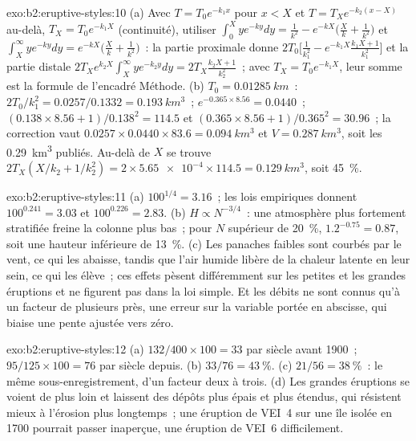 \begin{solution}{exo:b2:eruptive-styles:10}
(a) Avec $T = T_0e^{-k_1x}$ pour $x < X$ et $T = T_Xe^{-k_2(x - X)}$ au-delà, $T_X =
T_0e^{-k_1X}$ (continuité), utiliser $\int_0^X ye^{-ky}dy = \frac{1}{k^2} - e^{-kX}\big(\frac{X}{k} +
\frac{1}{k^2}\big)$ et $\int_X^\infty ye^{-ky}dy = e^{-kX}\big(\frac{X}{k} +
\frac{1}{k^2}\big)$~:
la partie proximale donne $2T_0\big[\frac{1}{k_1^2} - e^{-k_1X}\frac{k_1X + 1}{k_1^2}\big]$ et la
partie distale $2T_Xe^{k_2X}\int_X^\infty ye^{-k_2y}dy = 2T_X\frac{k_2X + 1}{k_2^2}$~; avec $T_X =
T_0e^{-k_1X}$, leur somme est la formule de l'encadré Méthode.
(b) $T_0 = \qty{0.01285}{km}$~: $2T_0/k_1^2 = 0.0257/0.1332 = \qty{0.193}{km^3}$~;
$e^{-0.365\times8.56} = 0.0440$~; $(0.138\times8.56 + 1)/0.138^2 = 114.5$ et
$(0.365\times8.56 + 1)/0.365^2 = 30.96$~; la correction vaut $0.0257\times0.0440\times83.6
= \qty{0.094}{km^3}$ et $V = \qty{0.287}{km^3}$, soit les \qty{0.29}{km^3} publiés.
Au-delà de $X$ se trouve $2T_X(X/k_2 + 1/k_2^2) = 2\times\num{5.65e-4}\times114.5 =
\qty{0.129}{km^3}$, soit \qty{45}{\percent}.
\end{solution}

\begin{solution}{exo:b2:eruptive-styles:11}
(a) $100^{1/4} = 3.16$~; les lois empiriques donnent $100^{0.241} = 3.03$ et
$100^{0.226} = 2.83$. (b) $H \propto N^{-3/4}$~: une atmosphère plus fortement stratifiée
freine la colonne plus bas~; pour $N$ supérieur de \qty{20}{\percent},
$1.2^{-0.75} = 0.87$, soit une hauteur inférieure de \qty{13}{\percent}. (c) Les panaches faibles sont
courbés par le vent, ce qui les abaisse, tandis que l'air humide libère de la chaleur latente en
leur sein, ce qui les élève~; ces effets pèsent différemment sur les petites et les grandes
éruptions et ne figurent pas dans la loi simple. Et les débits ne sont connus qu'à
un facteur de plusieurs près, une erreur sur la variable portée en abscisse, qui biaise
une pente ajustée vers zéro.
\end{solution}

\begin{solution}{exo:b2:eruptive-styles:12}
(a) $132/400\times100 = 33$ par siècle avant 1900~; $95/125\times100 = 76$ par
siècle depuis. (b) $33/76 = \qty{43}{\percent}$. (c) $21/56 = \qty{38}{\percent}$~:
le même sous-enregistrement, d'un facteur deux à trois. (d) Les grandes éruptions se voient
de plus loin et laissent des dépôts plus épais et plus étendus, qui résistent mieux à l'érosion
plus longtemps~; une éruption de VEI~4 sur une île isolée en 1700 pourrait passer inaperçue, une
éruption de VEI~6 difficilement.
\end{solution}

